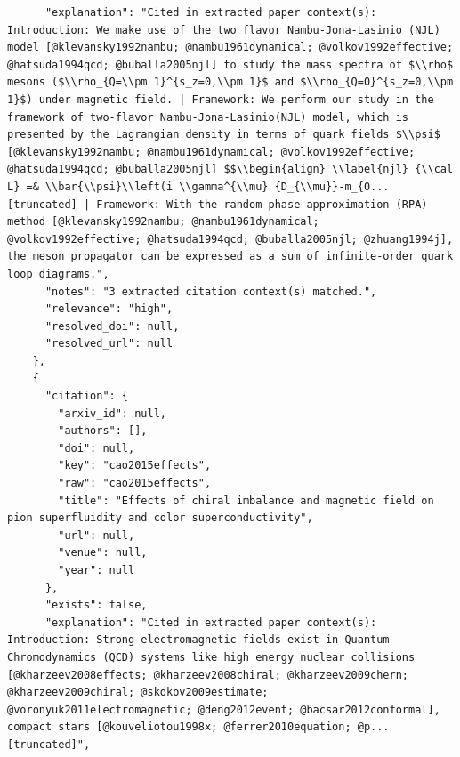 \documentclass[11pt]{article}
\begin{document}
\begin{verbatim}
      "explanation": "Cited in extracted paper context(s): Introduction: We make use of the two flavor Nambu-Jona-Lasinio (NJL) model [@klevansky1992nambu; @nambu1961dynamical; @volkov1992effective; @hatsuda1994qcd; @buballa2005njl] to study the mass spectra of $\\rho$ mesons ($\\rho_{Q=\\pm 1}^{s_z=0,\\pm 1}$ and $\\rho_{Q=0}^{s_z=0,\\pm 1}$) under magnetic field. | Framework: We perform our study in the framework of two-flavor Nambu-Jona-Lasinio(NJL) model, which is presented by the Lagrangian density in terms of quark fields $\\psi$ [@klevansky1992nambu; @nambu1961dynamical; @volkov1992effective; @hatsuda1994qcd; @buballa2005njl] $$\\begin{align} \\label{njl} {\\cal L} =& \\bar{\\psi}\\left(i \\gamma^{\\mu} {D_{\\mu}}-m_{0... [truncated] | Framework: With the random phase approximation (RPA) method [@klevansky1992nambu; @nambu1961dynamical; @volkov1992effective; @hatsuda1994qcd; @buballa2005njl; @zhuang1994j], the meson propagator can be expressed as a sum of infinite-order quark loop diagrams.",
      "notes": "3 extracted citation context(s) matched.",
      "relevance": "high",
      "resolved_doi": null,
      "resolved_url": null
    },
    {
      "citation": {
        "arxiv_id": null,
        "authors": [],
        "doi": null,
        "key": "cao2015effects",
        "raw": "cao2015effects",
        "title": "Effects of chiral imbalance and magnetic field on pion superfluidity and color superconductivity",
        "url": null,
        "venue": null,
        "year": null
      },
      "exists": false,
      "explanation": "Cited in extracted paper context(s): Introduction: Strong electromagnetic fields exist in Quantum Chromodynamics (QCD) systems like high energy nuclear collisions [@kharzeev2008effects; @kharzeev2008chiral; @kharzeev2009chern; @kharzeev2009chiral; @skokov2009estimate; @voronyuk2011electromagnetic; @deng2012event; @bacsar2012conformal], compact stars [@kouveliotou1998x; @ferrer2010equation; @p... [truncated]",

\end{verbatim}
\end{document}
